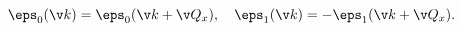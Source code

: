 \begin{equation}
\label{epseps}
 \eps_0(\v k)= \eps_0(\v k+\v Q_x),\ \ \
 \eps_1(\v k)= -\eps_1(\v k+\v Q_x).
\end{equation}

